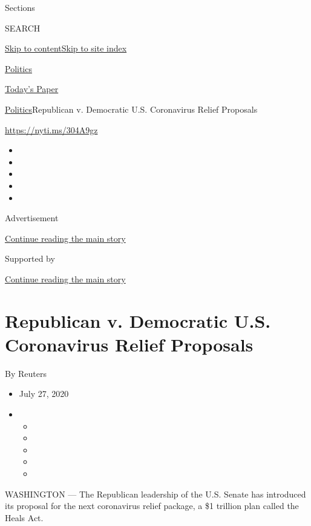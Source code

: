 Sections

SEARCH

\protect\hyperlink{site-content}{Skip to
content}\protect\hyperlink{site-index}{Skip to site index}

\href{https://www.nytimes.com/section/politics}{Politics}

\href{https://myaccount.nytimes.com/auth/login?response_type=cookie\&client_id=vi}{}

\href{https://www.nytimes.com/section/todayspaper}{Today's Paper}

\href{/section/politics}{Politics}\textbar{}Republican v. Democratic
U.S. Coronavirus Relief Proposals

\url{https://nyti.ms/304A9gz}

\begin{itemize}
\item
\item
\item
\item
\item
\end{itemize}

Advertisement

\protect\hyperlink{after-top}{Continue reading the main story}

Supported by

\protect\hyperlink{after-sponsor}{Continue reading the main story}

\hypertarget{republican-v-democratic-us-coronavirus-relief-proposals}{%
\section{Republican v. Democratic U.S. Coronavirus Relief
Proposals}\label{republican-v-democratic-us-coronavirus-relief-proposals}}

By Reuters

\begin{itemize}
\item
  July 27, 2020
\item
  \begin{itemize}
  \item
  \item
  \item
  \item
  \item
  \end{itemize}
\end{itemize}

WASHINGTON --- The Republican leadership of the U.S. Senate has
introduced its proposal for the next coronavirus relief package, a \$1
trillion plan called the Heals Act.

